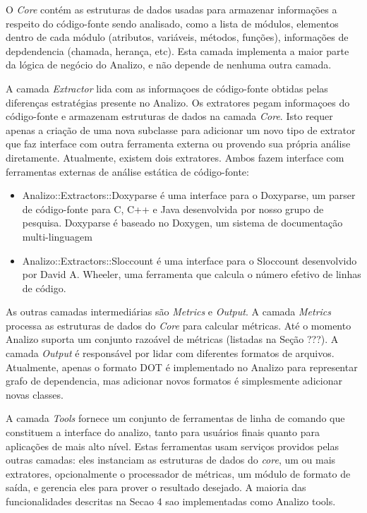 \documentclass{article}
\begin{document}
O {\it Core} contém as estruturas de dados usadas para armazenar informações
a respeito do código-fonte sendo analisado, como a lista de módulos, elementos
dentro de cada módulo (atributos, variáveis, métodos, funções), informações de
depdendencia (chamada, herança, etc). Esta camada implementa a maior parte da lógica
de negócio do Analizo, e não depende de nenhuma outra camada.

A camada {\it Extractor} lida com as informaçoes de código-fonte obtidas pelas
diferenças estratégias presente no Analizo. Os extratores pegam informaçoes do código-fonte
e armazenam estruturas de dados na camada {\it Core}. Isto requer apenas a criação
de uma nova subclasse para adicionar um novo tipo de extrator que faz interface
com outra ferramenta externa ou provendo sua própria análise diretamente.
Atualmente, existem dois extratores. Ambos fazem interface com ferramentas externas
de análise estática de código-fonte:

\begin{itemize}
  \item Analizo::Extractors::Doxyparse é uma interface para o Doxyparse, um parser
        de código-fonte para C, C++ e Java desenvolvida por nosso grupo de pesquisa\cite{Costa2009}.
        Doxyparse é baseado no Doxygen, um sistema de documentação multi-linguagem
  \item Analizo::Extractors::Sloccount é uma interface para o Sloccount desenvolvido por
        David A. Wheeler, uma ferramenta que calcula o número efetivo de linhas de código.
\end{itemize}

As outras camadas intermediárias são {\it Metrics} e {\it Output}. A camada {\it Metrics}
processa as estruturas de dados do {\it Core} para calcular métricas. Até o momento Analizo
suporta um conjunto razoável de métricas (listadas na Seção ???). A camada {\it Output} é
responsável por lidar com diferentes formatos de arquivos. Atualmente, apenas o formato DOT
é implementado no Analizo para representar grafo de dependencia, mas adicionar novos formatos
é simplesmente adicionar novas classes.

A camada {\it Tools} fornece um conjunto de ferramentas de linha de comando que constituem
a interface do analizo, tanto para usuários finais quanto para aplicações de mais alto nível.
Estas ferramentas usam serviços providos pelas outras camadas: eles instanciam as estruturas
de dados do {\it core}, um ou mais extratores, opcionalmente o processador de métricas, um
módulo de formato de saída, e gerencia eles para prover o resultado desejado. A maioria das
funcionalidades descritas na Secao 4 sao implementadas como Analizo tools.
\end{document}
